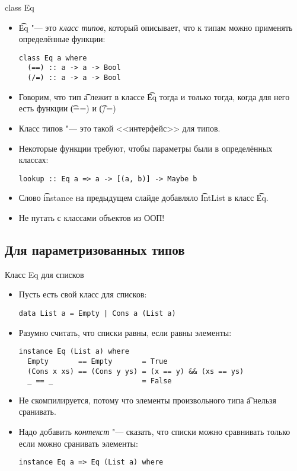 \begin{frame}[fragile]{class Eq}
	\begin{itemize}
		\item \t{Eq} "--- это \textit{класс типов}, который описывает, что к типам можно применять определённые функции:
\begin{verbatim}
class Eq a where
  (==) :: a -> a -> Bool
  (/=) :: a -> a -> Bool
\end{verbatim}
		\item Говорим, что тип \t{a} лежит в классе \t{Eq} тогда и только тогда, когда для него есть функции \t{(==)} и \t{(/=)}
		\item Класс типов "--- это такой <<интерфейс>> для типов.
		\item Некоторые функции требуют, чтобы параметры были в определённых классах:
\begin{verbatim}
lookup :: Eq a => a -> [(a, b)] -> Maybe b
\end{verbatim}
		\item Слово \t{instance} на предыдущем слайде добавляло \t{IntList} в класс \t{Eq}.
		\item Не путать с классами объектов из ООП!
	\end{itemize}
\end{frame}

\subsection{Для параметризованных типов}
\begin{frame}[fragile]{Класс Eq для списков}
	\begin{itemize}
		\item Пусть есть свой класс для списков:
\begin{verbatim}
data List a = Empty | Cons a (List a)
\end{verbatim}
		\item Разумно считать, что списки равны, если равны элементы:
\begin{verbatim}
instance Eq (List a) where
  Empty       == Empty       = True
  (Cons x xs) == (Cons y ys) = (x == y) && (xs == ys)
  _ == _                     = False
\end{verbatim}
		\item Не скомпилируется, потому что элементы произвольного типа \t{a} нельзя сранивать.
		\item Надо добавить \textit{контекст} "--- сказать, что списки можно сравнивать только если можно сранивать элементы:
\begin{verbatim}
instance Eq a => Eq (List a) where
\end{verbatim}
	\end{itemize}
\end{frame}
